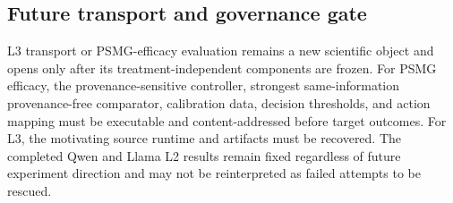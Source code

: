 \subsection{Future transport and governance gate}
\label{app:fresh}
L3 transport or PSMG-efficacy evaluation remains a new scientific object and opens only after its treatment-independent components are frozen. For PSMG efficacy, the provenance-sensitive controller, strongest same-information provenance-free comparator, calibration data, decision thresholds, and action mapping must be executable and content-addressed before target outcomes. For L3, the motivating source runtime and artifacts must be recovered. The completed Qwen and Llama L2 results remain fixed regardless of future experiment direction and may not be reinterpreted as failed attempts to be rescued.
